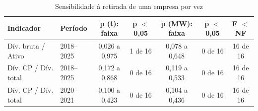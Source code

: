 \begin{table}[htb]
\caption{Sensibilidade à retirada de uma empresa por vez}\label{tab:loo}
\centering\footnotesize\setlength{\tabcolsep}{4pt}
\begin{tabular}{llccccc}
\toprule
Indicador & Período & p (t): faixa & p $<$ 0,05 & p (MW): faixa & p $<$ 0,05 & F $<$ NF \\
\midrule
Dív. bruta / Ativo & 2018--2025 & 0,026 a 0,975 & 1 de 16 & 0,078 a 0,648 & 0 de 16 & 16 de 16 \\
Dív. CP / Dív. total & 2018--2025 & 0,172 a 0,868 & 0 de 16 & 0,119 a 0,533 & 0 de 16 & 16 de 16 \\
Dív. CP / Dív. total & 2020--2021 & 0,100 a 0,423 & 0 de 16 & 0,104 a 0,436 & 0 de 16 & 16 de 16 \\
\bottomrule
\end{tabular}
\end{table}
